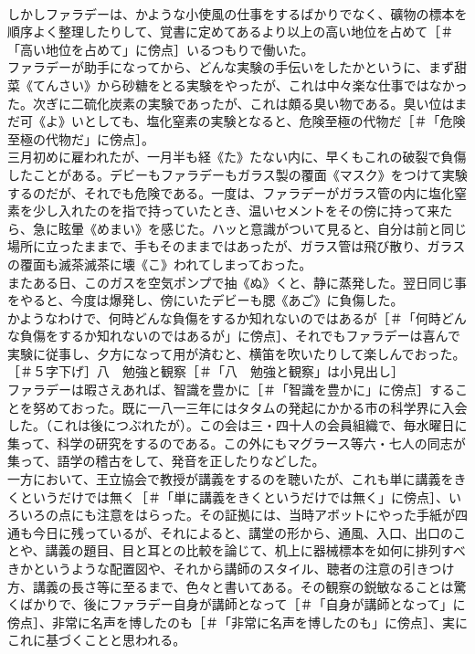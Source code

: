 \documentclass[8pt]{extreport}
\begin{document}
\begin{CJK}{UTF8}{min}
\\	しかしファラデーは、かような小使風の仕事をするばかりでなく、礦物の標本を順序よく整理したりして、覚書に定めてあるより以上の高い地位を占めて［＃「高い地位を占めて」に傍点］いるつもりで働いた。
\\	ファラデーが助手になってから、どんな実験の手伝いをしたかというに、まず甜菜《てんさい》から砂糖をとる実験をやったが、これは中々楽な仕事ではなかった。次ぎに二硫化炭素の実験であったが、これは頗る臭い物である。臭い位はまだ可《よ》いとしても、塩化窒素の実験となると、危険至極の代物だ［＃「危険至極の代物だ」に傍点］。
\\	三月初めに雇われたが、一月半も経《た》たない内に、早くもこれの破裂で負傷したことがある。デビーもファラデーもガラス製の覆面《マスク》をつけて実験するのだが、それでも危険である。一度は、ファラデーがガラス管の内に塩化窒素を少し入れたのを指で持っていたとき、温いセメントをその傍に持って来たら、急に眩暈《めまい》を感じた。ハッと意識がついて見ると、自分は前と同じ場所に立ったままで、手もそのままではあったが、ガラス管は飛び散り、ガラスの覆面も滅茶滅茶に壊《こ》われてしまっておった。
\\	またある日、このガスを空気ポンプで抽《ぬ》くと、静に蒸発した。翌日同じ事をやると、今度は爆発し、傍にいたデビーも腮《あご》に負傷した。
\\	かようなわけで、何時どんな負傷をするか知れないのではあるが［＃「何時どんな負傷をするか知れないのではあるが」に傍点］、それでもファラデーは喜んで実験に従事し、夕方になって用が済むと、横笛を吹いたりして楽しんでおった。
\\	［＃５字下げ］八　勉強と観察［＃「八　勉強と観察」は小見出し］
\\	ファラデーは暇さえあれば、智識を豊かに［＃「智識を豊かに」に傍点］することを努めておった。既に一八一三年にはタタムの発起にかかる市の科学界に入会した。（これは後につぶれたが）。この会は三・四十人の会員組織で、毎水曜日に集って、科学の研究をするのである。この外にもマグラース等六・七人の同志が集って、語学の稽古をして、発音を正したりなどした。
\\	一方において、王立協会で教授が講義をするのを聴いたが、これも単に講義をきくというだけでは無く［＃「単に講義をきくというだけでは無く」に傍点］、いろいろの点にも注意をはらった。その証拠には、当時アボットにやった手紙が四通も今日に残っているが、それによると、講堂の形から、通風、入口、出口のことや、講義の題目、目と耳との比較を論じて、机上に器械標本を如何に排列すべきかというような配置図や、それから講師のスタイル、聴者の注意の引きつけ方、講義の長さ等に至るまで、色々と書いてある。その観察の鋭敏なることは驚くばかりで、後にファラデー自身が講師となって［＃「自身が講師となって」に傍点］、非常に名声を博したのも［＃「非常に名声を博したのも」に傍点］、実にこれに基づくことと思われる。

\end{CJK}
\end{document}
